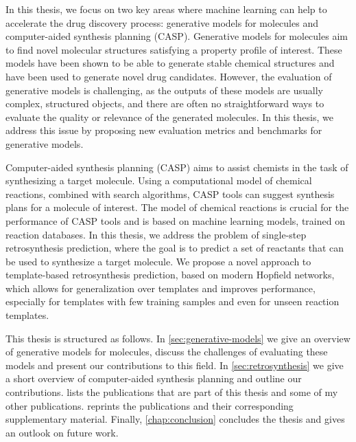 In this thesis, we focus on two key areas where machine learning can help to accelerate
the drug discovery process: generative models for molecules and computer-aided
synthesis planning (CASP). Generative models for molecules aim to find novel
molecular structures satisfying a property profile of interest. These models 
have been shown to be able to generate stable chemical structures and have been
used to generate novel drug candidates. However, the evaluation of generative 
models is challenging, as the outputs of these models are usually complex, structured
objects, and there are often no straightforward ways to evaluate the quality or relevance 
of the generated molecules. In this thesis, we address this issue by proposing new
evaluation metrics and benchmarks for generative models.

Computer-aided synthesis planning (CASP) aims to assist chemists in the task of
synthesizing a target molecule. Using a computational model of chemical
reactions, combined with search algorithms, CASP tools can suggest synthesis
plans for a molecule of interest. The model of chemical reactions is crucial for
the performance of CASP tools and is based on machine learning models, trained 
on reaction databases. In this thesis, we address the problem of single-step
retrosynthesis prediction, where the goal is to predict a set of reactants that
can be used to synthesize a target molecule. We propose a novel approach to
template-based retrosynthesis prediction, based on modern Hopfield networks,
which allows for generalization over templates and improves performance, especially
for templates with few training samples and even for unseen reaction templates.

This thesis is structured as follows. In \cref{sec:generative-models} we give 
an overview of generative models for molecules, discuss the challenges of evaluating
these models and present our contributions to this field. In \cref{sec:retrosynthesis}
we give a short overview of computer-aided synthesis planning and outline our contributions. 
 lists the publications that are part of this thesis and 
some of my other publications.  reprints the publications
and their corresponding supplementary material. Finally, \cref{chap:conclusion} concludes
the thesis and gives an outlook on future work.




